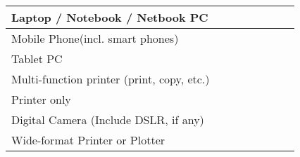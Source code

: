 \documentclass[a4paper,10pt, total={10.95in, 8in}]{article} %
\begin{document}
\begin{table}[H]
\begin{adjustbox}{width=6in}
\begin{tabular}{|p{6.5cm}|lllllll|}
Laptop / Notebook / Netbook PC                                     & \multicolumn{1}{l|}{}               & \multicolumn{1}{l|}{}                & \multicolumn{1}{l|}{}               & \multicolumn{1}{l|}{}                & \multicolumn{1}{l|}{}               & \multicolumn{1}{l|}{}                &                                                                  \\ \hline
Mobile Phone\footnotemark[2] (incl. smart phones)                                  & \multicolumn{1}{l|}{}               & \multicolumn{1}{l|}{}                & \multicolumn{1}{l|}{}               & \multicolumn{1}{l|}{}                & \multicolumn{1}{l|}{}               & \multicolumn{1}{l|}{}                &                                                                  \\ \hline
Tablet PC                                                          & \multicolumn{1}{l|}{}               & \multicolumn{1}{l|}{}                & \multicolumn{1}{l|}{}               & \multicolumn{1}{l|}{}                & \multicolumn{1}{l|}{}               & \multicolumn{1}{l|}{}                &                                                                  \\ \hline
Multi-function printer (print, copy, etc.)                         & \multicolumn{1}{l|}{}               & \multicolumn{1}{l|}{}                & \multicolumn{1}{l|}{}               & \multicolumn{1}{l|}{}                & \multicolumn{1}{l|}{}               & \multicolumn{1}{l|}{}                &                                                                  \\ \hline
Printer only                                                       & \multicolumn{1}{l|}{}               & \multicolumn{1}{l|}{}                & \multicolumn{1}{l|}{}               & \multicolumn{1}{l|}{}                & \multicolumn{1}{l|}{}               & \multicolumn{1}{l|}{}                &                                                                  \\ \hline
Digital Camera (Include DSLR, if any)                              & \multicolumn{1}{l|}{}               & \multicolumn{1}{l|}{}                & \multicolumn{1}{l|}{}               & \multicolumn{1}{l|}{}                & \multicolumn{1}{l|}{}               & \multicolumn{1}{l|}{}                &                                                                  \\ \hline
Wide-format Printer or Plotter                                     & \multicolumn{1}{l|}{}               & \multicolumn{1}{l|}{}                & \multicolumn{1}{l|}{}               & \multicolumn{1}{l|}{}                & \multicolumn{1}{l|}{}               & \multicolumn{1}{l|}{}                &                                                                  \\ \hline

\end{tabular}
\end{adjustbox}
\end{table}
\end{document}
